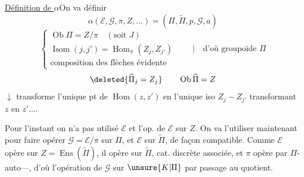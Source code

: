 \uline{Définition de $\alpha$}\qquad On va définir
\[
\alpha(\mathcal E,\mathcal G,\pi,Z,\ldots)=(\Pi,\widetilde\Pi,p,\mathcal G,a)
\]
\[
\left\{\begin{array}{l}
\operatorname{Ob}\Pi=Z/\pi\quad(\text{soit }J)\\
\operatorname{Isom}(j,j')=\operatorname{Hom}_{\pi}(Z_j,Z_{j'})\\
\text{composition des flèches évidente}
\end{array}\right.\qquad\bigg|\quad\text{d'où groupoïde }\Pi
\]
\[
\deleted{\widetilde\Pi_j=Z_j}\qquad\operatorname{Ob}\widetilde\Pi=Z
\]
$\downarrow$ transforme l'unique pt de $\operatorname{Hom}(z,z')$ en l'unique \inserted{$\pi$-}iso $Z_j\mathbin{-}Z_{j'}$ transformant $z$ en $z'\ldots.$

Pour l'instant on n'a pas utilisé $\mathcal E$ et l'op. de $\mathcal E$ sur $Z$. On va l'utiliser maintenant pour faire opérer $\mathcal G=\mathcal E/\pi$ sur $\Pi$, et $\mathcal E$ sur $\widetilde\Pi$, de façon compatible.
Comme $\mathcal E$ opère sur $Z=\operatorname{Ens}(\widetilde\Pi)$, il opère  sur $\widetilde\Pi$, cat. discrète associée,  et  $\pi$ opère par $\Pi$-auto---, d'où l'opération de $\mathcal G$ sur $\unsure{K|\Pi}$ par passage au quotient.
